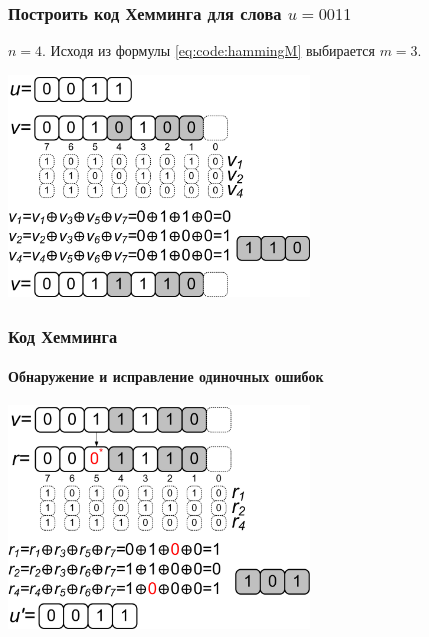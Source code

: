 \begin{frame}
    \frametitle{Построить код Хемминга для слова $u=0011$}
    
    $n=4$. Исходя из формулы \eqref{eq:code:hammingM} выбирается $m=3$.
    
    \begin{center}
        \includegraphics[width=0.6\textwidth]{fig/hammingEncode}
    \end{center}
\end{frame}

\begin{frame}
    \frametitle{Код Хемминга}
    \framesubtitle{Обнаружение и исправление одиночных ошибок}
    
    \begin{center}
        \includegraphics[width=0.6\textwidth]{fig/hammingDecode}
    \end{center}
\end{frame}

